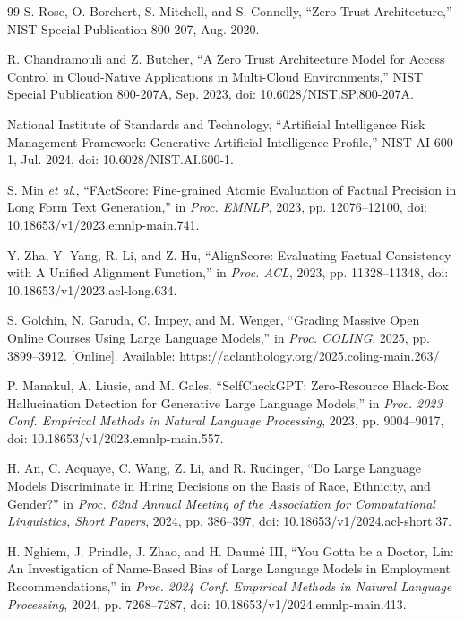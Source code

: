 \documentclass[conference]{IEEEtran}
\begin{document}

\begin{thebibliography}{99}
S. Rose, O. Borchert, S. Mitchell, and S. Connelly,
``Zero Trust Architecture,''
NIST Special Publication 800-207, Aug. 2020.

R. Chandramouli and Z. Butcher,
``A Zero Trust Architecture Model for Access Control in Cloud-Native Applications in Multi-Cloud Environments,''
NIST Special Publication 800-207A, Sep. 2023, doi: 10.6028/NIST.SP.800-207A.

National Institute of Standards and Technology,
``Artificial Intelligence Risk Management Framework: Generative Artificial Intelligence Profile,''
NIST AI 600-1, Jul. 2024, doi: 10.6028/NIST.AI.600-1.

S. Min \emph{et al.}, ``FActScore: Fine-grained Atomic Evaluation of Factual Precision in Long Form Text Generation,'' in \emph{Proc. EMNLP}, 2023, pp. 12076--12100, doi: 10.18653/v1/2023.emnlp-main.741.

Y. Zha, Y. Yang, R. Li, and Z. Hu, ``AlignScore: Evaluating Factual Consistency with A Unified Alignment Function,'' in \emph{Proc. ACL}, 2023, pp. 11328--11348, doi: 10.18653/v1/2023.acl-long.634.

S. Golchin, N. Garuda, C. Impey, and M. Wenger, ``Grading Massive Open Online Courses Using Large Language Models,'' in \emph{Proc. COLING}, 2025, pp. 3899--3912. [Online]. Available: \url{https://aclanthology.org/2025.coling-main.263/}

P. Manakul, A. Liusie, and M. Gales,
``SelfCheckGPT: Zero-Resource Black-Box Hallucination Detection for Generative Large Language Models,''
in \emph{Proc. 2023 Conf. Empirical Methods in Natural Language Processing}, 2023, pp. 9004--9017, doi: 10.18653/v1/2023.emnlp-main.557.

H. An, C. Acquaye, C. Wang, Z. Li, and R. Rudinger,
``Do Large Language Models Discriminate in Hiring Decisions on the Basis of Race, Ethnicity, and Gender?''
in \emph{Proc. 62nd Annual Meeting of the Association for Computational Linguistics, Short Papers}, 2024, pp. 386--397, doi: 10.18653/v1/2024.acl-short.37.

H. Nghiem, J. Prindle, J. Zhao, and H. Daum\'{e} III,
``You Gotta be a Doctor, Lin: An Investigation of Name-Based Bias of Large Language Models in Employment Recommendations,''
in \emph{Proc. 2024 Conf. Empirical Methods in Natural Language Processing}, 2024, pp. 7268--7287, doi: 10.18653/v1/2024.emnlp-main.413.


\end{thebibliography}
\end{document}
